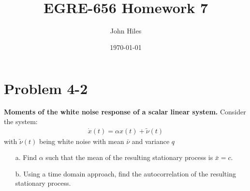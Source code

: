 \documentclass{article}
\title{EGRE-656 Homework 7}
\author{John Hiles}
\date\today
\begin{document}
\maketitle %

\section*{Problem 4-2}
\textbf{Moments of the white noise response of a scalar linear system.}
Consider the system:
\begin{align*}
\dot{x}(t) = \alpha x(t) + \tilde{\nu}(t)
\end{align*}
with $\tilde{\nu}(t)$ being white noise with mean $\bar{\nu}$ and variance $q$
\begin{enumerate}
\item[a.] Find $\alpha$ such that the mean of the resulting stationary process is $\bar{x}=c$.
\item[b.] Using a time domain approach, find the autocorrelation of the resulting stationary process.
\end{enumerate}
\end{document}
